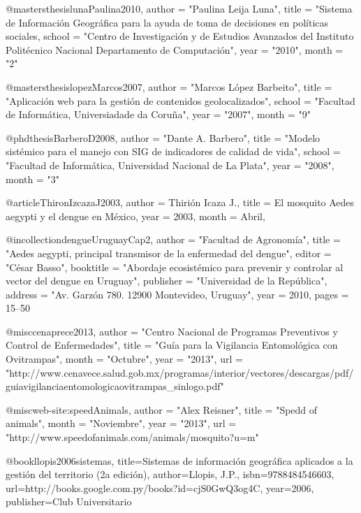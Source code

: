 @mastersthesis{lunaPaulina2010,
    author    = "Paulina Leija Luna",
    title     = "Sistema de Información Geográfica para la ayuda de toma de decisiones en políticas sociales,
    school    = "Centro de Investigación y de Estudios Avanzados del Instituto Politécnico Nacional Departamento de Computación",
    year      = "2010",
    month     = "2"
}

@mastersthesis{lopezMarcos2007,
    author    = "Marcos López Barbeito",
    title     = "Aplicación web para la gestión de contenidos geolocalizados",
    school    = "Facultad de Informática, Universiadade da Coruña",
    year      = "2007",
    month     = "9"
}

@phdthesis{BarberoD2008,
    author    = "Dante A. Barbero",
    title     = "Modelo sistémico para el manejo con SIG de indicadores de calidad de vida",
    school    = "Facultad de Informática, Universidad Nacional de La Plata",
    year      = "2008",
    month     = "3"
}

@article{ThironIzcazaJ2003,
    author = {Thirión Icaza J.},
    title = {El mosquito Aedes aegypti y el dengue en México},
    year = {2003},
    month = {Abril},
}

@incollection{dengueUruguayCap2,
  author      = "Facultad de Agronomía",
  title       = "Aedes aegypti, principal transmisor de la enfermedad del dengue",
  editor      = "César Basso",
  booktitle   = "Abordaje ecosistémico para prevenir y controlar al vector del dengue en Uruguay",
  publisher   = "Universidad de la República",
  address     = "Av. Garzón 780. 12900 Montevideo, Uruguay",
  year        = 2010,
  pages = {15--50}
}

@misc{cenaprece2013,
      author = "Centro Nacional de Programas Preventivos y Control de Enfermedades",
      title = "Guía para la Vigilancia Entomológica con Ovitrampas",
      month = "Octubre",
      year = "2013",
      url = "http://www.cenavece.salud.gob.mx/programas/interior/vectores/descargas/pdf/guiavigilanciaentomologicaovitrampas_sinlogo.pdf"
}


@misc{web-site:speedAnimals,
      author = "Alex Reisner",
      title = "Spedd of animals",
      month = "Noviembre",
      year = "2013",
      url = "http://www.speedofanimals.com/animals/mosquito?u=m"
}

@book{llopis2006sistemas,
  title={Sistemas de informaci{\'o}n geogr{\'a}fica aplicados a la gesti{\'o}n del territorio (2a edici{\'o}n)},
  author={Llopis, J.P.},
  isbn={9788484546603},
  url={http://books.google.com.py/books?id=cjS0GwQ3og4C},
  year={2006},
  publisher={Club Universitario}
}
